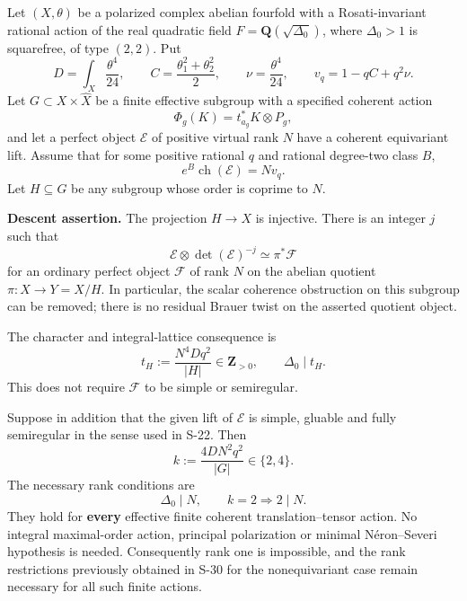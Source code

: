 \begin{theorem}
\label{thm:semireg-prime-to-rank-descent}
Let \((X,\theta)\) be a polarized complex abelian fourfold with a Rosati-invariant rational action of the real quadratic field \(F=\mathbf Q(\sqrt{\Delta_0})\), where \(\Delta_0>1\) is squarefree, of type \((2,2)\). Put \[
 D=\int_X\frac{\theta^4}{24},\qquad
 C=\frac{\theta_1^2+\theta_2^2}{2},\qquad
 \nu=\frac{\theta^4}{24},\qquad
 v_q=1-qC+q^2\nu.
 \tag{S35.1}
\] Let \(G\subset X\times\widehat X\) be a finite effective subgroup with a specified coherent action \[
 \Phi_g(K)=t_{a_g}^*K\otimes P_g,
\] and let a perfect object \(\mathcal E\) of positive virtual rank \(N\) have a coherent equivariant lift. Assume that for some positive rational \(q\) and rational degree-two class \(B\), \[
 e^B\operatorname{ch}(\mathcal E)=Nv_q.
 \tag{S35.2}
\] Let \(H\subseteq G\) be any subgroup whose order is coprime to \(N\).

\textbf{Descent assertion.} The projection \(H\to X\) is injective. There is an integer \(j\) such that \[
 \mathcal E\otimes\det(\mathcal E)^{-j}
           \simeq\pi^*\mathcal F
 \tag{S35.3}
\] for an ordinary perfect object \(\mathcal F\) of rank \(N\) on the abelian quotient \(\pi:X\to Y=X/H\). In particular, the scalar coherence obstruction on this subgroup can be removed; there is no residual Brauer twist on the asserted quotient object.

The character and integral-lattice consequence is \[
 t_H:=\frac{N^4Dq^2}{|H|}\in\mathbf Z_{>0},
 \qquad \Delta_0\mid t_H.
 \tag{S35.4}
\] This does not require \(\mathcal F\) to be simple or semiregular.

Suppose in addition that the given lift of \(\mathcal E\) is simple, gluable and fully semiregular in the sense used in S-22. Then \[
 k:=\frac{4DN^2q^2}{|G|}\in\{2,4\}.
\] The necessary rank conditions are \[
 \boxed{\Delta_0\mid N,\qquad k=2\Longrightarrow 2\mid N.}
 \tag{S35.5}
\] They hold for \textbf{every} effective finite coherent translation--tensor action. No integral maximal-order action, principal polarization or minimal Néron--Severi hypothesis is needed. Consequently rank one is impossible, and the rank restrictions previously obtained in S-30 for the nonequivariant case remain necessary for all such finite actions.
\end{theorem}
